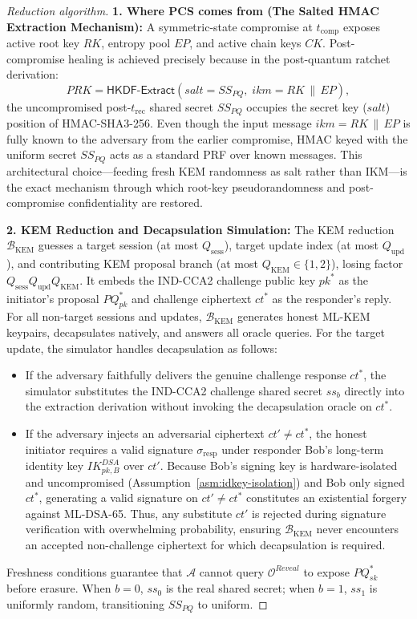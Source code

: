 \documentclass[11pt,a4paper]{article}
\theoremstyle{remark}
\theoremstyle{plain}
\newcommand{\calO}{\mathcal{O}}
\newcommand{\HKDFExtract}{\mathsf{HKDF\text{-}Extract}}
\begin{document}
\begin{proof}[Reduction algorithm]
\textbf{1. Where PCS comes from (The Salted HMAC Extraction Mechanism):}
A symmetric-state compromise at $t_{\mathrm{comp}}$ exposes active root key $RK$, entropy pool $EP$, and active chain keys $CK$.  Post-compromise healing is achieved precisely because in the post-quantum ratchet derivation:
\[
  PRK = \HKDFExtract(salt = SS_{PQ},\; ikm = RK \,\|\, EP),
\]
the uncompromised post-$t_{\mathrm{rec}}$ shared secret $SS_{PQ}$ occupies the secret key ($salt$) position of HMAC-SHA3-256.  Even though the input message $ikm = RK \,\|\, EP$ is fully known to the adversary from the earlier compromise, HMAC keyed with the uniform secret $SS_{PQ}$ acts as a standard PRF over known messages.  This architectural choice—feeding fresh KEM randomness as salt rather than IKM—is the exact mechanism through which root-key pseudorandomness and post-compromise confidentiality are restored.

\medskip\noindent
\textbf{2. KEM Reduction and Decapsulation Simulation:}
The KEM reduction $\mathcal{B}_{\mathrm{KEM}}$ guesses a target session (at most $Q_{\mathrm{sess}}$), target update index (at most $Q_{\mathrm{upd}}$), and contributing KEM proposal branch (at most $Q_{\mathrm{KEM}} \in \{1, 2\}$), losing factor $Q_{\mathrm{sess}}Q_{\mathrm{upd}}Q_{\mathrm{KEM}}$.  It embeds the IND-CCA2 challenge public key $pk^*$ as the initiator's proposal $PQ_{pk}^*$ and challenge ciphertext $ct^*$ as the responder's reply.
For all non-target sessions and updates, $\mathcal{B}_{\mathrm{KEM}}$ generates honest ML-KEM keypairs, decapsulates natively, and answers all oracle queries.
For the target update, the simulator handles decapsulation as follows:
\begin{itemize}
  \item If the adversary faithfully delivers the genuine challenge response $ct^*$, the simulator substitutes the IND-CCA2 challenge shared secret $ss_b$ directly into the extraction derivation without invoking the decapsulation oracle on $ct^*$.
  \item If the adversary injects an adversarial ciphertext $ct' \neq ct^*$, the honest initiator requires a valid signature $\sigma_{\mathrm{resp}}$ under responder Bob's long-term identity key $IK^{DSA}_{pk,B}$ over $ct'$.  Because Bob's signing key is hardware-isolated and uncompromised (Assumption~\ref{asm:idkey-isolation}) and Bob only signed $ct^*$, generating a valid signature on $ct' \neq ct^*$ constitutes an existential forgery against ML-DSA-65.  Thus, any substitute $ct'$ is rejected during signature verification with overwhelming probability, ensuring $\mathcal{B}_{\mathrm{KEM}}$ never encounters an accepted non-challenge ciphertext for which decapsulation is required.
\end{itemize}
Freshness conditions guarantee that $\mathcal{A}$ cannot query $\calO^{Reveal}$ to expose $PQ_{sk}^*$ before erasure.  When $b=0$, $ss_0$ is the real shared secret; when $b=1$, $ss_1$ is uniformly random, transitioning $SS_{PQ}$ to uniform.


\end{proof}
\end{document}
